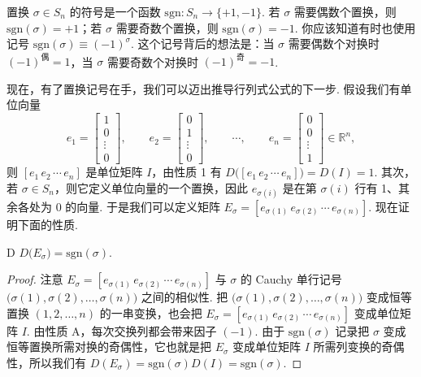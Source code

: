 置换 $\sigma\in S_n$ 的符号是一个函数 $\mathrm{sgn}:S_n\to\{+1,-1\}$. 若 $\sigma$ 需要偶数个置换，则 $\mathrm{sgn}(\sigma)=+1$；若 $\sigma$ 需要奇数个置换，则 $\mathrm{sgn}(\sigma)=-1$. 你应该知道有时也使用记号 $\mathrm{sgn}(\sigma)\equiv(-1)^\sigma$. 这个记号背后的想法是：当 $\sigma$ 需要偶数个对换时 $(-1)^{\text{偶}}=1$，当 $\sigma$ 需要奇数个对换时 $(-1)^{\text{奇}}=-1$.

现在，有了置换记号在手，我们可以迈出推导行列式公式的下一步. 假设我们有单位向量
\[
e_1=\begin{bmatrix}1\\0\\\vdots\\0\end{bmatrix},\qquad
e_2=\begin{bmatrix}0\\1\\\vdots\\0\end{bmatrix},\qquad\cdots,\qquad
e_n=\begin{bmatrix}0\\0\\\vdots\\1\end{bmatrix}\in\mathbb{R}^n,
\]
则 $[e_1\,e_2\,\cdots\,e_n]$ 是单位矩阵 $I$，由性质 1 有 $D\bigl([e_1\,e_2\,\cdots\,e_n]\bigr)=D(I)=1$. 其次，若 $\sigma\in S_n$，则它定义单位向量的一个置换，因此 $e_{\sigma(i)}$ 是在第 $\sigma(i)$ 行有 1、其余各处为 0 的向量. 于是我们可以定义矩阵 $E_\sigma=[e_{\sigma(1)}\,e_{\sigma(2)}\,\cdots\,e_{\sigma(n)}]$. 现在证明下面的性质.

\begin{property}{D}\label{prop:1-D}
$D\bigl(E_\sigma\bigr)=\mathrm{sgn}(\sigma)$.
\end{property}

\begin{proof}
注意 $E_\sigma=[e_{\sigma(1)}\,e_{\sigma(2)}\,\cdots\,e_{\sigma(n)}]$ 与 $\sigma$ 的 Cauchy 单行记号 $\bigl(\sigma(1),\sigma(2),\ldots,\sigma(n)\bigr)$ 之间的相似性. 把 $\bigl(\sigma(1),\sigma(2),\ldots,\sigma(n)\bigr)$ 变成恒等置换 $(1,2,\ldots,n)$ 的一串变换，也会把 $E_\sigma=[e_{\sigma(1)}\,e_{\sigma(2)}\,\cdots\,e_{\sigma(n)}]$ 变成单位矩阵 $I$. 由性质 A，每次交换列都会带来因子 $(-1)$. 由于 $\mathrm{sgn}(\sigma)$ 记录把 $\sigma$ 变成恒等置换所需对换的奇偶性，它也就是把 $E_\sigma$ 变成单位矩阵 $I$ 所需列变换的奇偶性，所以我们有 $D(E_\sigma)=\mathrm{sgn}(\sigma)D(I)=\mathrm{sgn}(\sigma)$.
\end{proof}

